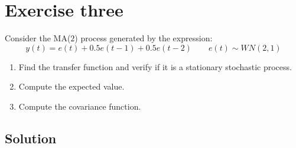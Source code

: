 \section{Exercise three}

Consider the MA($2$) process generated by the expression: 
\[y(t)=e(t)+0.5e(t-1)+0.5e(t-2) \qquad e(t) \sim WN(2,1)\]
\begin{enumerate}
    \item Find the transfer function and verify if it is a stationary stochastic process.
    \item Compute the expected value. 
    \item Compute the covariance function. 
\end{enumerate}

\subsection{Solution}
